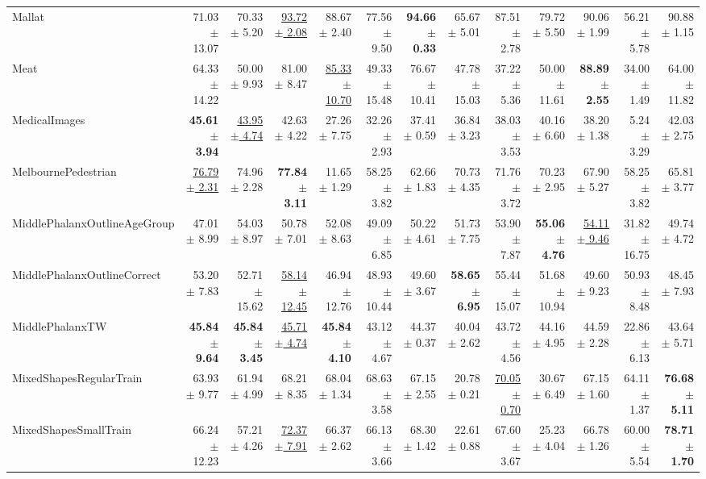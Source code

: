 \begin{landscape}
\begin{longtable}{lrrrrrrrrrrrr}
Mallat & 71.03 $\pm$ 13.07 & 70.33 $\pm$ 5.20 & \underline{93.72 $\pm$ 2.08} & 88.67 $\pm$ 2.40 & 77.56 $\pm$ 9.50 & \textbf{94.66 $\pm$ 0.33} & 65.67 $\pm$ 5.01 & 87.51 $\pm$ 2.78 & 79.72 $\pm$ 5.50 & 90.06 $\pm$ 1.99 & 56.21 $\pm$ 5.78 & 90.88 $\pm$ 1.15 \\
Meat & 64.33 $\pm$ 14.22 & 50.00 $\pm$ 9.93 & 81.00 $\pm$ 8.47 & \underline{85.33 $\pm$ 10.70} & 49.33 $\pm$ 15.48 & 76.67 $\pm$ 10.41 & 47.78 $\pm$ 15.03 & 37.22 $\pm$ 5.36 & 50.00 $\pm$ 11.61 & \textbf{88.89 $\pm$ 2.55} & 34.00 $\pm$ 1.49 & 64.00 $\pm$ 11.82 \\
MedicalImages & \textbf{45.61 $\pm$ 3.94} & \underline{43.95 $\pm$ 4.74} & 42.63 $\pm$ 4.22 & 27.26 $\pm$ 7.75 & 32.26 $\pm$ 2.93 & 37.41 $\pm$ 0.59 & 36.84 $\pm$ 3.23 & 38.03 $\pm$ 3.53 & 40.16 $\pm$ 6.60 & 38.20 $\pm$ 1.38 & 5.24 $\pm$ 3.29 & 42.03 $\pm$ 2.75 \\
MelbournePedestrian & \underline{76.79 $\pm$ 2.31} & 74.96 $\pm$ 2.28 & \textbf{77.84 $\pm$ 3.11} & 11.65 $\pm$ 1.29 & 58.25 $\pm$ 3.82 & 62.66 $\pm$ 1.83 & 70.73 $\pm$ 4.35 & 71.76 $\pm$ 3.72 & 70.23 $\pm$ 2.95 & 67.90 $\pm$ 5.27 & 58.25 $\pm$ 3.82 & 65.81 $\pm$ 3.77 \\
MiddlePhalanxOutlineAgeGroup & 47.01 $\pm$ 8.99 & 54.03 $\pm$ 8.97 & 50.78 $\pm$ 7.01 & 52.08 $\pm$ 8.63 & 49.09 $\pm$ 6.85 & 50.22 $\pm$ 4.61 & 51.73 $\pm$ 7.75 & 53.90 $\pm$ 7.87 & \textbf{55.06 $\pm$ 4.76} & \underline{54.11 $\pm$ 9.46} & 31.82 $\pm$ 16.75 & 49.74 $\pm$ 4.72 \\
MiddlePhalanxOutlineCorrect & 53.20 $\pm$ 7.83 & 52.71 $\pm$ 15.62 & \underline{58.14 $\pm$ 12.45} & 46.94 $\pm$ 12.76 & 48.93 $\pm$ 10.44 & 49.60 $\pm$ 3.67 & \textbf{58.65 $\pm$ 6.95} & 55.44 $\pm$ 15.07 & 51.68 $\pm$ 10.94 & 49.60 $\pm$ 9.23 & 50.93 $\pm$ 8.48 & 48.45 $\pm$ 7.93 \\
MiddlePhalanxTW & \textbf{45.84 $\pm$ 9.64} & \textbf{45.84 $\pm$ 3.45} & \underline{45.71 $\pm$ 4.74} & \textbf{45.84 $\pm$ 4.10} & 43.12 $\pm$ 4.67 & 44.37 $\pm$ 0.37 & 40.04 $\pm$ 2.62 & 43.72 $\pm$ 4.56 & 44.16 $\pm$ 4.95 & 44.59 $\pm$ 2.28 & 22.86 $\pm$ 6.13 & 43.64 $\pm$ 5.71 \\
MixedShapesRegularTrain & 63.93 $\pm$ 9.77 & 61.94 $\pm$ 4.99 & 68.21 $\pm$ 8.35 & 68.04 $\pm$ 1.34 & 68.63 $\pm$ 3.58 & 67.15 $\pm$ 2.55 & 20.78 $\pm$ 0.21 & \underline{70.05 $\pm$ 0.70} & 30.67 $\pm$ 6.49 & 67.15 $\pm$ 1.60 & 64.11 $\pm$ 1.37 & \textbf{76.68 $\pm$ 5.11} \\
MixedShapesSmallTrain & 66.24 $\pm$ 12.23 & 57.21 $\pm$ 4.26 & \underline{72.37 $\pm$ 7.91} & 66.37 $\pm$ 2.62 & 66.13 $\pm$ 3.66 & 68.30 $\pm$ 1.42 & 22.61 $\pm$ 0.88 & 67.60 $\pm$ 3.67 & 25.23 $\pm$ 4.04 & 66.78 $\pm$ 1.26 & 60.00 $\pm$ 5.54 & \textbf{78.71 $\pm$ 1.70} \\

\end{longtable}
\end{landscape}
